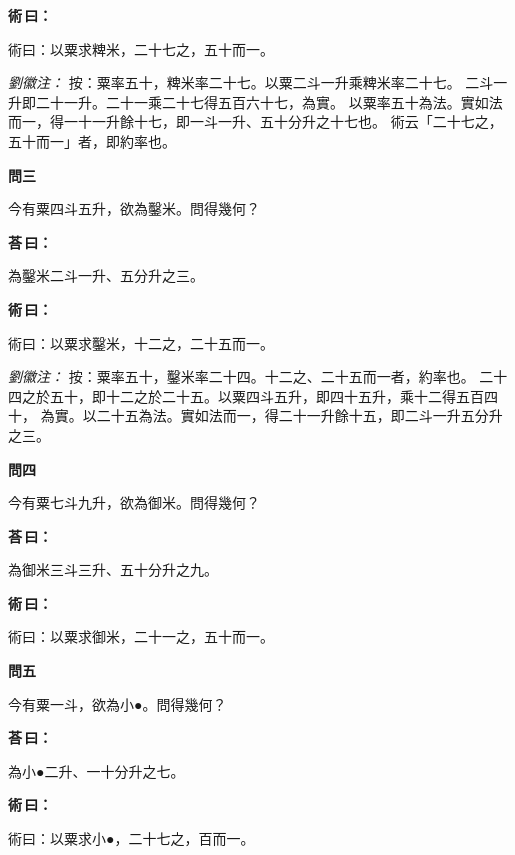 \documentclass[11pt,a4paper]{article}
\newenvironment{problem}[1][]{%
  \par\vspace{0.6em}\noindent\textcolor{problemcolor}{\textbf{問\ignorespaces#1\unskip}\hspace{0.5em}}%
  \ignorespaces
}{\par\vspace{0.4em}}
\newenvironment{answer}{%
  \par\noindent\textcolor{answercolor}{\textbf{荅\,曰：}}%
  \ignorespaces
}{\par\vspace{0.3em}}
\newenvironment{method}{%
  \par\noindent\textcolor{methodcolor}{\textbf{術\,曰：}}%
  \ignorespaces
}{\par\vspace{0.4em}}
\newenvironment{liuhuicomm}{%
  \par\vspace{0.3em}\noindent\textcolor{commentarycolor}{\small\textit{劉徽注：}}}%
  {\par\vspace{0.5em}}
\begin{document}
\begin{method}
術曰：以粟求粺米，二十七之，五十而一。
\end{method}

\begin{liuhuicomm}
按：粟率五十，粺米率二十七。以粟二斗一升乘粺米率二十七。
二斗一升即二十一升。二十一乘二十七得五百六十七，為實。
以粟率五十為法。實如法而一，得一十一升餘十七，即一斗一升、五十分升之十七也。
術云「二十七之，五十而一」者，即約率也。
\end{liuhuicomm}

\begin{problem}[三]
今有粟四斗五升，欲為鑿米。問得幾何？
\end{problem}

\begin{answer}
為鑿米二斗一升、五分升之三。
\end{answer}

\begin{method}
術曰：以粟求鑿米，十二之，二十五而一。
\end{method}

\begin{liuhuicomm}
按：粟率五十，鑿米率二十四。十二之、二十五而一者，約率也。
二十四之於五十，即十二之於二十五。以粟四斗五升，即四十五升，乘十二得五百四十，
為實。以二十五為法。實如法而一，得二十一升餘十五，即二斗一升五分升之三。
\end{liuhuicomm}

\begin{problem}[四]
今有粟七斗九升，欲為御米。問得幾何？
\end{problem}

\begin{answer}
為御米三斗三升、五十分升之九。
\end{answer}

\begin{method}
術曰：以粟求御米，二十一之，五十而一。
\end{method}

\begin{problem}[五]
今有粟一斗，欲為小●。問得幾何？
\end{problem}

\begin{answer}
為小●二升、一十分升之七。
\end{answer}

\begin{method}
術曰：以粟求小●，二十七之，百而一。
\end{method}
\end{document}
